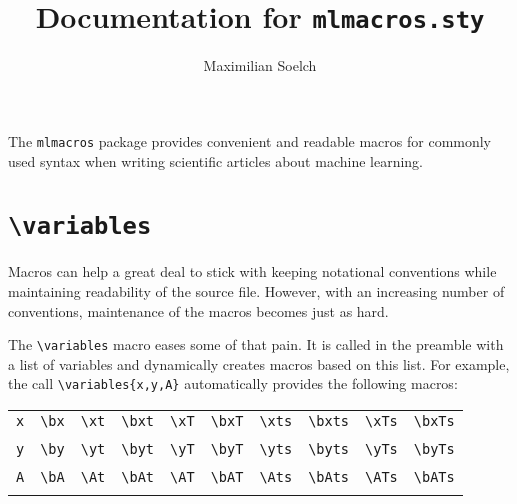\documentclass
[
twoside, %
]
{article}
\title{Documentation for \texttt{mlmacros.sty}}
\author{Maximilian Soelch}
\begin{document}
\maketitle
The \texttt{mlmacros} package provides convenient and readable macros for commonly used syntax when writing scientific articles about machine learning.

\section{\texttt{\textbackslash variables}}
Macros can help a great deal to stick with keeping notational conventions while maintaining readability of the source file. However, with an increasing number of conventions, maintenance of the macros becomes just as hard.

The \texttt{\textbackslash variables} macro eases some of that pain. It is called in the preamble with a list of variables and dynamically creates macros based on this list. For example, the call \texttt{\textbackslash variables\{x,y,A\}} automatically provides the following macros:

\begin{table}[hb]
	\centering
	\begin{tabular}{cccccccccc}
		\texttt{x} & \texttt{\textbackslash bx}& \texttt{\textbackslash xt} & \texttt{\textbackslash bxt} &\texttt{\textbackslash xT} & \texttt{\textbackslash bxT} & \texttt{\textbackslash xts} & \texttt{\textbackslash bxts} & \texttt{\textbackslash xTs} & \texttt{\textbackslash bxTs}\\
					& \bx & \xt & \bxt & \xT & \bxT & \xts  & \bxts & \xTs & \bxTs\\
		\texttt{y} & \texttt{\textbackslash by}& \texttt{\textbackslash yt} & \texttt{\textbackslash byt} &\texttt{\textbackslash yT} & \texttt{\textbackslash byT} & \texttt{\textbackslash yts} & \texttt{\textbackslash byts} & \texttt{\textbackslash yTs} & \texttt{\textbackslash byTs}\\
		& \by & \yt & \byt & \yT & \byT & \yts  & \byts & \yTs & \byTs\\
		\texttt{A} & \texttt{\textbackslash bA}& \texttt{\textbackslash At} & \texttt{\textbackslash bAt} &\texttt{\textbackslash AT} & \texttt{\textbackslash bAT} & \texttt{\textbackslash Ats} & \texttt{\textbackslash bAts} & \texttt{\textbackslash ATs} & \texttt{\textbackslash bATs}\\
		& \bA & \At & \bAt & \AT & \bAT & \Ats  & \bAts & \ATs & \bATs
	\end{tabular}
\end{table}
\end{document}
